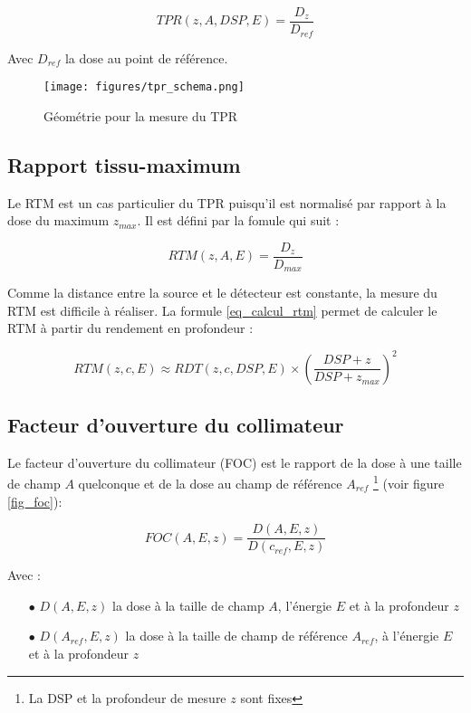 \documentclass{article}
\begin{document}
\begin{equation}
    TPR(z, A, DSP, E) = \dfrac{D_z}{D_{ref}}
    \label{eq_tpr}
\end{equation}

Avec $D_{ref}$ la dose au point de référence.

\begin{figure}[h] 
  \centering
  \texttt{[image: figures/tpr\_schema.png]}
  \caption{Géométrie pour la mesure du TPR}
  \label{fig_tpr}
\end{figure}

\subsection{Rapport tissu-maximum}

Le RTM est un cas particulier du TPR puisqu'il est normalisé par rapport à la dose du maximum $z_{max}$. Il est défini par la fomule qui suit :

\begin{equation}
    RTM(z, A, E) = \dfrac{D_z}{D_{max}}
    \label{eq_rtm}
\end{equation}

Comme la distance entre la source et le détecteur est constante, la mesure du RTM est difficile à réaliser. La formule \ref{eq_calcul_rtm} permet de calculer le RTM à partir du rendement en profondeur \cite{podgorsak2005radiation} :

\begin{equation}
    RTM(z, c, E) \approx RDT(z, c, DSP, E) \times \left(\dfrac{DSP + z}{DSP + z_{max}}\right)^2
    \label{eq_calcul_rtm}
\end{equation}

\subsection{Facteur d'ouverture du collimateur}

Le facteur d'ouverture du collimateur (FOC) est le rapport de la dose à une taille de champ $A$ quelconque et de la dose au champ de référence $A_{ref}$ \footnote{La DSP et la profondeur de mesure $z$ sont fixes} (voir figure \ref*{fig_foc}):

\begin{equation}
    FOC(A, E, z) = \dfrac{D(A, E, z)}{D(c_{ref}, E, z)}
    \label{eq_foc}
\end{equation}

Avec :

\begin{itemize}
    \item[$\bullet$] $D(A, E, z)$ la dose à la taille de champ $A$, l'énergie $E$ et à la profondeur $z$
    \item[$\bullet$] $D(A_{ref}, E, z)$ la dose à la taille de champ de référence $A_{ref}$, à l'énergie $E$ et à la profondeur $z$
\end{itemize}
\end{document}
